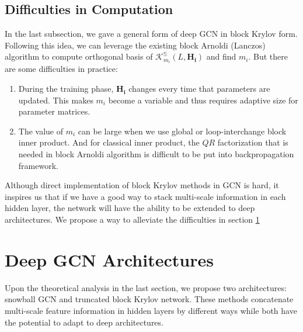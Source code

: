 \documentclass{article}
\begin{document}
\subsection{Difficulties in Computation}
\label{difficulty}
In the last subsection, we gave a general form of deep GCN in block Krylov form. Following this idea, we can leverage the existing block Arnoldi (Lanczos) algorithm \cite{frommer2017block, frommer2017radau} to compute orthogonal basis of $\mathcal{K}_{m_i}^{\mathbb{S}} (L,\bm{H_i})$ and find $m_i$. But there are some difficulties in practice:
\begin{enumerate}[leftmargin=12pt]
\item During the training phase, $\bm{H_i}$ changes every time that parameters are updated. This makes $m_i$ become a variable and thus requires adaptive size for parameter matrices.
\item The value of $m_i$ can be large when we use global or loop-interchange block inner product. And for classical inner product, the $QR$ factorization that is needed in block Arnoldi algorithm \cite{frommer2017block} is difficult to be put into backpropagation framework.
\end{enumerate}

Although direct implementation of block Krylov methods in GCN is hard, it inspires us that if we have a good way to stack multi-scale information in each hidden layer, the network will have the ability to be extended to deep architectures. We propose a way to alleviate the difficulties in section \ref{deep}
\section{Deep GCN Architectures}
\label{deep}
Upon the theoretical analysis in the last section, we propose two architectures: snowball GCN and truncated block Krylov network. These methods concatenate multi-scale feature information in hidden layers by different ways while both have the potential to adapt to deep architectures.
\end{document}
